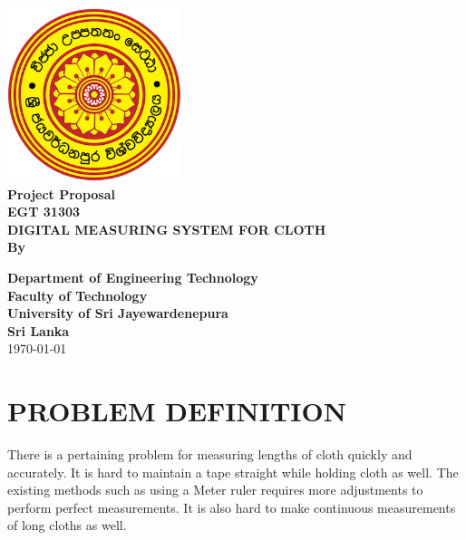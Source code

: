 \documentclass[12pt,a4paper]{article}
\begin{document}
\begin{titlepage}
\center %
{
\includegraphics[width=2in,height=2in,keepaspectratio]{logo.png}\\[0.5cm]
\fontsize{16pt}{24}\selectfont \textbf{Project Proposal}\\[0.5cm]
\fontsize{16pt}{24}\selectfont \textbf{EGT 31303}\\[0.75cm]
\fontsize{24pt}{30}\selectfont \textbf{\uppercase{Digital Measuring System for Cloth}}\\[1.5cm]
\fontsize{16pt}{24}\selectfont \textbf{By}\\[0.5cm]
\fontsize{12pt}{12}


\vspace{1.5cm}
\fontsize{12pt}{12}\selectfont \textbf {Department of Engineering Technology \\ Faculty of Technology\\University of Sri Jayewardenepura\\ Sri Lanka}\\ \today 
}


\end{titlepage}

\setcounter{page}{1}

\section{\uppercase {Problem Definition}}

There is a pertaining problem for measuring lengths of cloth quickly and accurately. It is hard to maintain a tape straight while holding cloth as well. The existing methods such as using a Meter ruler requires more adjustments to perform perfect measurements. It is also hard to make continuous measurements of long cloths as well. \\[1cm]
\end{document}
